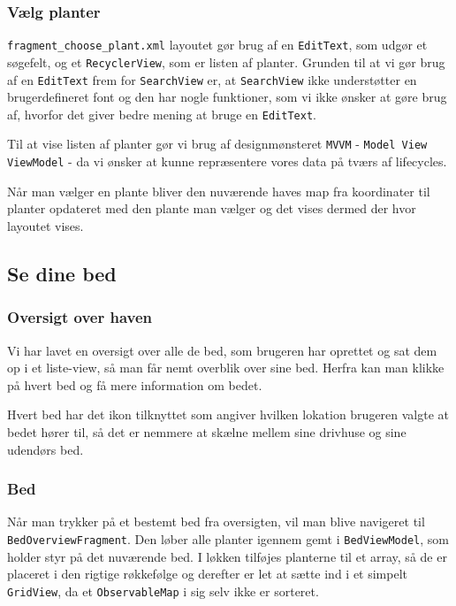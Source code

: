 \subsubsection{Vælg planter}

\texttt{fragment\_choose\_plant.xml} layoutet gør brug af en \texttt{EditText}, som udgør et søgefelt, og et \texttt{RecyclerView}, som er listen af planter.
Grunden til at vi gør brug af en \texttt{EditText} frem for \texttt{SearchView} er, at \texttt{SearchView} ikke understøtter en brugerdefineret font og den har nogle funktioner, som vi ikke ønsker at gøre brug af, hvorfor det giver bedre mening at bruge en \texttt{EditText}.

Til at vise listen af planter gør vi brug af designmønsteret \texttt{MVVM} - \texttt{Model View ViewModel} - da vi ønsker at kunne repræsentere vores data på tværs af lifecycles.

Når man vælger en plante bliver den nuværende haves map fra koordinater til planter opdateret med den plante man vælger og det vises dermed der hvor layoutet vises.

\subsection{Se dine bed}

\subsubsection{Oversigt over haven}

Vi har lavet en oversigt over alle de bed, som brugeren har oprettet og sat dem op i et liste-view, så man får nemt overblik over sine bed. Herfra kan man klikke på hvert bed og få mere information om bedet.

Hvert bed har det ikon tilknyttet som angiver hvilken lokation brugeren valgte at bedet hører til, så det er nemmere at skælne mellem sine drivhuse og sine udendørs bed.

\subsubsection{Bed}
Når man trykker på et bestemt bed fra oversigten, vil man blive navigeret til \texttt{BedOverviewFragment}. Den løber alle planter igennem gemt i \texttt{BedViewModel}, som holder styr på det nuværende bed. I løkken tilføjes planterne til et array, så de er placeret i den rigtige røkkefølge og derefter er let at sætte ind i et simpelt \texttt{GridView}, da et \texttt{ObservableMap} i sig selv ikke er sorteret.

